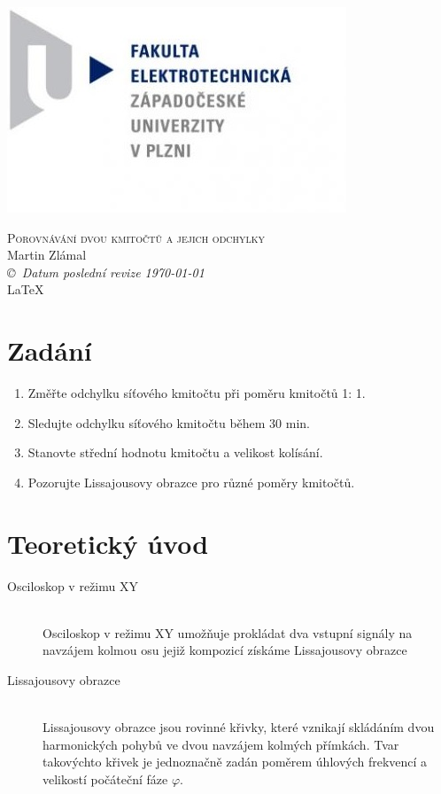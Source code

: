 \documentclass[12pt]{article} %
\begin{document}
\begin{titlepage}
	\includegraphics[scale=0.7]{logo.jpg}
	\vspace*{\fill}
	\begin{center}
		\textsc{\LARGE Porovnávání dvou kmitočtů a jejich odchylky}\\[1cm]
		Martin Zlámal \\[1cm]
		{\small\em \copyright \ Datum poslední revize \today } \\
		\LaTeX
	\end{center}
	\vspace*{\fill}
\end{titlepage}
\newpage

\section{Zadání}
\begin{enumerate}
\item Změřte odchylku síťového kmitočtu při poměru kmitočtů 1: 1.
\item Sledujte odchylku síťového kmitočtu během 30 min.
\item Stanovte střední hodnotu kmitočtu a velikost kolísání.
\item Pozorujte Lissajousovy obrazce pro různé poměry kmitočtů.
\end{enumerate}

\section{Teoretický úvod}
\begin{description}
\item[Osciloskop v režimu XY] \hfill \\
Osciloskop v režimu XY umožňuje prokládat dva vstupní signály na navzájem kolmou osu jejiž kompozicí získáme Lissajousovy obrazce
\item[Lissajousovy obrazce] \hfill \\
Lissajousovy obrazce jsou rovinné křivky, které vznikají skládáním dvou 
harmonických pohybů ve dvou navzájem kolmých přímkách. Tvar takovýchto křivek je 
jednoznačně zadán poměrem úhlových frekvencí a velikostí počáteční fáze $\varphi$.
\end{description}
\end{document}
